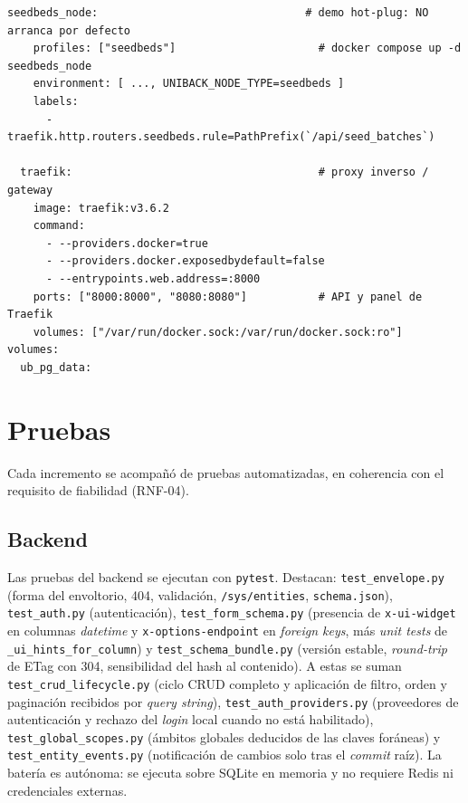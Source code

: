 \begin{lstlisting}[style=dockeryaml, caption={Docker Compose multinodo del Incremento~4 (condensado)}, label={lst:compose-multinodo}]
  seedbeds_node:                                # demo hot-plug: NO arranca por defecto
    profiles: ["seedbeds"]                      # docker compose up -d seedbeds_node
    environment: [ ..., UNIBACK_NODE_TYPE=seedbeds ]
    labels:
      - traefik.http.routers.seedbeds.rule=PathPrefix(`/api/seed_batches`)

  traefik:                                      # proxy inverso / gateway
    image: traefik:v3.6.2
    command:
      - --providers.docker=true
      - --providers.docker.exposedbydefault=false
      - --entrypoints.web.address=:8000
    ports: ["8000:8000", "8080:8080"]           # API y panel de Traefik
    volumes: ["/var/run/docker.sock:/var/run/docker.sock:ro"]
volumes:
  ub_pg_data:
\end{lstlisting}

\section{Pruebas}
Cada incremento se acompañó de pruebas automatizadas, en coherencia con el
requisito de fiabilidad (RNF-04).

\subsection{Backend}
Las pruebas del backend se ejecutan con \texttt{pytest}. Destacan:
\texttt{test\_\allowbreak envelope.\allowbreak py} (forma del envoltorio, 404, validación,
\texttt{/sys/entities}, \texttt{schema.json}), \texttt{test\_auth.py}
(autenticación), \texttt{test\_\allowbreak form\_\allowbreak schema.\allowbreak py} (presencia de
\texttt{x-\allowbreak ui-\allowbreak widget} en columnas \emph{datetime} y \texttt{x-\allowbreak options-\allowbreak endpoint}
en \emph{foreign keys}, más \emph{unit tests} de
\texttt{\_\allowbreak ui\_\allowbreak hints\_\allowbreak for\_\allowbreak column}) y \texttt{test\_\allowbreak schema\_\allowbreak bundle.\allowbreak py}
(versión estable, \emph{round-trip} de ETag con 304, sensibilidad del hash al
contenido). A estas se suman \texttt{test\_\allowbreak crud\_\allowbreak lifecycle.\allowbreak py}
(ciclo CRUD completo y aplicación de filtro, orden y paginación recibidos por
\emph{query string}), \texttt{test\_\allowbreak auth\_\allowbreak providers.\allowbreak py}
(proveedores de autenticación y rechazo del \emph{login} local cuando no está
habilitado), \texttt{test\_\allowbreak global\_\allowbreak scopes.\allowbreak py} (ámbitos
globales deducidos de las claves foráneas) y
\texttt{test\_\allowbreak entity\_\allowbreak events.\allowbreak py} (notificación de cambios
solo tras el \emph{commit} raíz). La batería es autónoma: se ejecuta sobre
SQLite en memoria y no requiere Redis ni credenciales externas.

